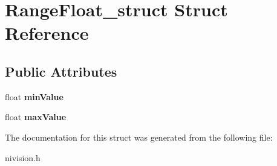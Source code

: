 \hypertarget{structRangeFloat__struct}{\section{\-Range\-Float\-\_\-struct \-Struct \-Reference}
\label{structRangeFloat__struct}
}
\subsection*{\-Public \-Attributes}
\begin{DoxyCompactItemize}
\item 
\hypertarget{structRangeFloat__struct_a524422b325edfecdbbec688b444569c8}{float {\bfseries min\-Value}}\label{structRangeFloat__struct_a524422b325edfecdbbec688b444569c8}

\item 
\hypertarget{structRangeFloat__struct_ad37829ad479fcb8a83a0ac3505d88896}{float {\bfseries max\-Value}}\label{structRangeFloat__struct_ad37829ad479fcb8a83a0ac3505d88896}

\end{DoxyCompactItemize}


\-The documentation for this struct was generated from the following file\-:\begin{DoxyCompactItemize}
\item 
nivision.\-h\end{DoxyCompactItemize}
